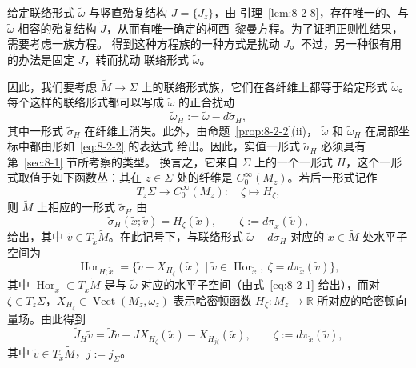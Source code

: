 \begin{remark}\label{rem:8-2-10}
给定联络形式 $\widetilde\omega$ 与竖直殆复结构 $J=\{J_z\}$，由
引理~\ref{lem:8-2-8}，存在唯一的、与 $\widetilde\omega$ 相容的殆复结构
$\widetilde J$，从而有唯一确定的柯西--黎曼方程。为了证明正则性结果，需要考虑一族方程。
得到这种方程族的一种方式是扰动 $J$。不过，另一种很有用的办法是固定 $J$，转而扰动
联络形式 $\widetilde\omega$。

因此，我们要考虑 $\widetilde M\to\Sigma$ 上的联络形式族，它们在各纤维上都等于给定形式
$\widetilde\omega$。每个这样的联络形式都可以写成 $\widetilde\omega$ 的正合扰动
\[
  \widetilde\omega_H:=\widetilde\omega-d\widetilde\sigma_H,
\]
其中一形式 $\widetilde\sigma_H$ 在纤维上消失。此外，由命题~\ref{prop:8-2-2}(ii)，
$\widetilde\omega$ 和 $\widetilde\omega_H$ 在局部坐标中都由形如~\eqref{eq:8-2-2} 的表达式
给出。因此，实值一形式 $\widetilde\sigma_H$ 必须具有第~\ref{sec:8-1} 节所考察的类型。
换言之，它来自 $\Sigma$ 上的一个一形式 $H$，这个一形式取值于如下函数丛：其在
$z\in\Sigma$ 处的纤维是 $C_0^\infty(M_z)$。若后一形式记作
\[
  T_z\Sigma\longrightarrow C_0^\infty(M_z):\quad
  \zeta\longmapsto H_\zeta,
\]
则 $\widetilde M$ 上相应的一形式 $\widetilde\sigma_H$ 由
\[
  \widetilde\sigma_H(\widetilde x;\widetilde v)=H_\zeta(\widetilde x),
  \qquad
  \zeta:=d\pi_{\widetilde x}(\widetilde v),
\]
给出，其中 $\widetilde v\in T_{\widetilde x}\widetilde M$。在此记号下，与联络形式
$\widetilde\omega-d\widetilde\sigma_H$ 对应的 $\widetilde x\in\widetilde M$ 处水平子空间为
\[
  \operatorname{Hor}_{H;\widetilde x}
  =\bigl\{\widetilde v-X_{H_\zeta}(\widetilde x)
  \mid \widetilde v\in\operatorname{Hor}_{\widetilde x},\ 
  \zeta=d\pi_{\widetilde x}(\widetilde v)\bigr\},
\]
其中 $\operatorname{Hor}_{\widetilde x}\subset T_{\widetilde x}\widetilde M$ 是与
$\widetilde\omega$ 对应的水平子空间（由式~\eqref{eq:8-2-1} 给出），而对
$\zeta\in T_z\Sigma$，$X_{H_\zeta}\in\operatorname{Vect}(M_z,\omega_z)$ 表示哈密顿函数
$H_\zeta:M_z\to\mathbb R$ 所对应的\BookRecordIndex{T0160}哈密顿向量场。由此得到
\[
  \widetilde J_H\widetilde v
  =\widetilde J\widetilde v
   +JX_{H_\zeta}(\widetilde x)-X_{H_{j\zeta}}(\widetilde x),
  \qquad
  \zeta:=d\pi_{\widetilde x}(\widetilde v),
\]
其中 $\widetilde v\in T_{\widetilde x}\widetilde M$，$j:=j_\Sigma$。
\end{remark}

